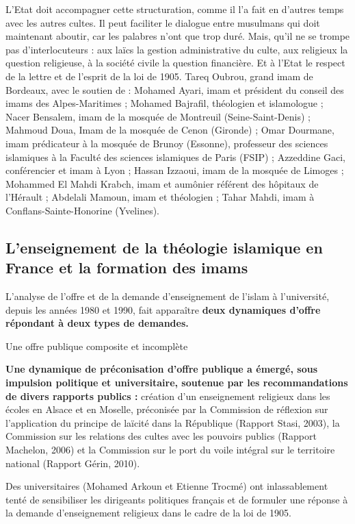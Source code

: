 L’Etat doit accompagner cette structuration, comme il l’a fait en d’autres temps avec les autres cultes. Il peut faciliter le dialogue entre musulmans qui doit maintenant aboutir, car les palabres n’ont que trop duré. Mais, qu’il ne se trompe pas d’interlocuteurs : aux laïcs la gestion administrative du culte, aux religieux la question religieuse, à la société civile la question financière. Et à l’Etat le respect de la lettre et de l’esprit de la loi de 1905.
Tareq Oubrou, grand imam de Bordeaux, avec le soutien de : Mohamed Ayari, imam et président du conseil des imams des Alpes-Maritimes ; Mohamed Bajrafil, théologien et islamologue ; Nacer Bensalem, imam de la mosquée de Montreuil (Seine-Saint-Denis) ; Mahmoud Doua, Imam de la mosquée de Cenon (Gironde) ; Omar Dourmane, imam prédicateur à la mosquée de Brunoy (Essonne), professeur des sciences islamiques à la Faculté des sciences islamiques de Paris (FSIP) ; Azzeddine Gaci, conférencier et imam à Lyon ; Hassan Izzaoui, imam de la mosquée de Limoges ; Mohammed El Mahdi Krabch, imam et aumônier référent des hôpitaux de l’Hérault ; Abdelali Mamoun, imam et théologien ; Tahar Mahdi, imam à Conflans-Sainte-Honorine (Yvelines).



\subsection*{L'enseignement de la théologie islamique en France et la formation des
imams}

L'analyse de l'offre et de la demande d'enseignement de l'islam à
l'université, depuis les années 1980 et 1990, fait apparaître
\textbf{deux dynamiques d'offre répondant à deux types de demandes.}


Une offre publique composite et incomplète


\textbf{Une dynamique de préconisation d'offre publique a émergé, sous
impulsion politique et universitaire, soutenue par les recommandations
de divers rapports publics :} création d'un enseignement religieux dans
les écoles en Alsace et en Moselle, préconisée par la Commission de
réflexion sur l'application du principe de laïcité dans la République
(Rapport Stasi, 2003), la Commission sur les relations des cultes avec
les pouvoirs publics (Rapport Machelon, 2006) et la Commission sur le
port du voile intégral sur le territoire national (Rapport Gérin, 2010).

Des universitaires (Mohamed Arkoun et Etienne Trocmé) ont inlassablement
tenté de sensibiliser les dirigeants politiques français et de formuler
une réponse à la demande d'enseignement religieux dans le cadre de la
loi de 1905.

